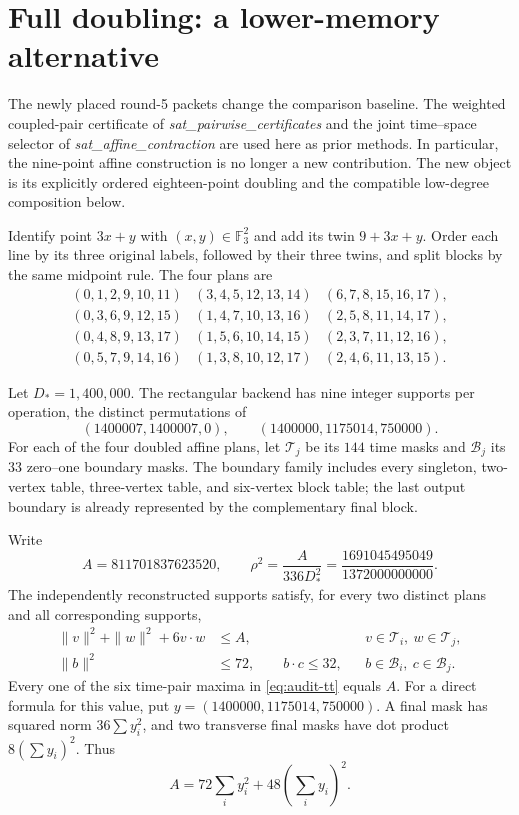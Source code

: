 \section{Full doubling: a lower-memory alternative}
\label{sec:double18}

The newly placed round-5 packets change the comparison baseline. The
weighted coupled-pair certificate of \emph{sat\_pairwise\_certificates} and
the joint time--space selector of \emph{sat\_affine\_contraction} are used
here as prior methods. In particular, the nine-point affine construction
is no longer a new contribution. The new object is its explicitly ordered
eighteen-point doubling and the compatible low-degree composition below.

Identify point $3x+y$ with $(x,y)\in\mathbb F_3^2$ and add its twin
$9+3x+y$. Order each line by its three original labels, followed by their
three twins, and split blocks by the same midpoint rule. The four plans are
\[
\begin{array}{lll}
(0,1,2,9,10,11)&(3,4,5,12,13,14)&(6,7,8,15,16,17),\\
(0,3,6,9,12,15)&(1,4,7,10,13,16)&(2,5,8,11,14,17),\\
(0,4,8,9,13,17)&(1,5,6,10,14,15)&(2,3,7,11,12,16),\\
(0,5,7,9,14,16)&(1,3,8,10,12,17)&(2,4,6,11,13,15).
\end{array}
\]

Let $D_*=1{,}400{,}000$. The rectangular backend has nine integer supports
per operation, the distinct permutations of
\[
 (1400007,1400007,0),\qquad (1400000,1175014,750000).
\]
For each of the four doubled affine plans, let $\mathcal T_j$ be its
$144$ time masks and $\mathcal B_j$ its $33$ zero--one boundary masks.
The boundary family includes every singleton, two-vertex table,
three-vertex table, and six-vertex block table; the last output boundary
is already represented by the complementary final block.

Write
\[
 A=811701837623520,
 \qquad \rho^2=\frac{A}{336D_*^2}
              =\frac{1691045495049}{1372000000000}.
\]
The independently reconstructed supports satisfy, for every two distinct
plans and all corresponding supports,
\begin{align}
 \|v\|^2+\|w\|^2+6v\cdot w&\le A,
       &&v\in\mathcal T_i,\ w\in\mathcal T_j,\label{eq:audit-tt}\\
 \|b\|^2&\le72,\qquad b\cdot c\le32,
       &&b\in\mathcal B_i,\ c\in\mathcal B_j.\label{eq:audit-bb}
\end{align}
Every one of the six time-pair maxima in \eqref{eq:audit-tt} equals $A$.
For a direct formula for this value, put
$y=(1400000,1175014,750000)$. A final mask has squared norm
$36\sum y_i^2$, and two transverse final masks have dot product
$8(\sum y_i)^2$. Thus
\[
 A=72\sum_i y_i^2+48\left(\sum_i y_i\right)^2.
\]

